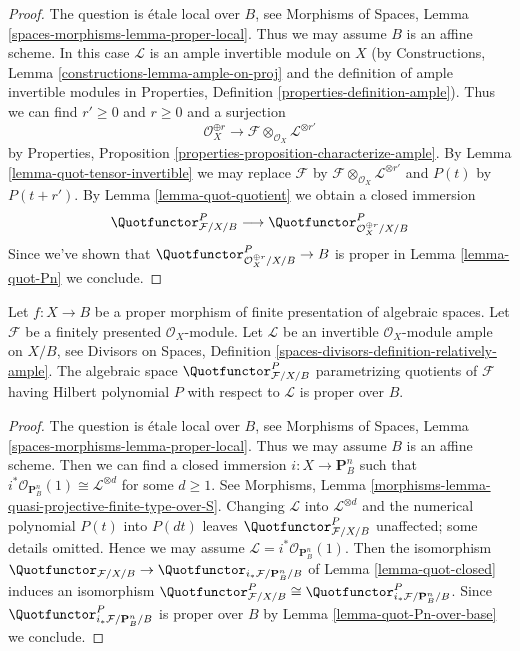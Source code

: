 \begin{proof}
The question is \'etale local over $B$, see
Morphisms of Spaces, Lemma \ref{spaces-morphisms-lemma-proper-local}.
Thus we may assume $B$ is an affine scheme.
In this case $\mathcal{L}$ is an ample invertible module on $X$
(by Constructions, Lemma \ref{constructions-lemma-ample-on-proj}
and the definition of ample invertible modules in
Properties, Definition \ref{properties-definition-ample}).
Thus we can find $r' \geq 0$ and $r \geq 0$ and a surjection
$$
\mathcal{O}_X^{\oplus r} \longrightarrow
\mathcal{F} \otimes_{\mathcal{O}_X} \mathcal{L}^{\otimes r'}
$$
by Properties, Proposition \ref{properties-proposition-characterize-ample}.
By Lemma \ref{lemma-quot-tensor-invertible}
we may replace $\mathcal{F}$ by
$\mathcal{F} \otimes_{\mathcal{O}_X} \mathcal{L}^{\otimes r'}$
and $P(t)$ by $P(t + r')$.
By Lemma \ref{lemma-quot-quotient}
we obtain a closed immersion
$$
\Quotfunctor^P_{\mathcal{F}/X/B}
\longrightarrow
\Quotfunctor^P_{\mathcal{O}_X^{\oplus r}/X/B}
$$
Since we've shown that $\Quotfunctor^P_{\mathcal{O}_X^{\oplus r}/X/B} \to B$
is proper in Lemma \ref{lemma-quot-Pn} we conclude.
\end{proof}

\begin{lemma}
\label{lemma-quot-proper-over-base}
Let $f : X \to B$ be a proper morphism of finite presentation
of algebraic spaces. Let $\mathcal{F}$ be a finitely presented
$\mathcal{O}_X$-module. Let $\mathcal{L}$ be an invertible
$\mathcal{O}_X$-module ample on $X/B$, see
Divisors on Spaces, Definition
\ref{spaces-divisors-definition-relatively-ample}.
The algebraic space $\Quotfunctor^P_{\mathcal{F}/X/B}$
parametrizing quotients of $\mathcal{F}$
having Hilbert polynomial $P$ with respect to $\mathcal{L}$
is proper over $B$.
\end{lemma}

\begin{proof}
The question is \'etale local over $B$, see
Morphisms of Spaces, Lemma \ref{spaces-morphisms-lemma-proper-local}.
Thus we may assume $B$ is an affine scheme.
Then we can find a closed immersion $i : X \to \mathbf{P}^n_B$
such that $i^*\mathcal{O}_{\mathbf{P}^n_B}(1) \cong \mathcal{L}^{\otimes d}$
for some $d \geq 1$. See
Morphisms, Lemma \ref{morphisms-lemma-quasi-projective-finite-type-over-S}.
Changing $\mathcal{L}$ into $\mathcal{L}^{\otimes d}$ and
the numerical polynomial $P(t)$ into $P(dt)$ leaves
$\Quotfunctor^P_{\mathcal{F}/X/B}$ unaffected; some details omitted.
Hence we may assume $\mathcal{L} = i^*\mathcal{O}_{\mathbf{P}^n_B}(1)$.
Then the isomorphism
$\Quotfunctor_{\mathcal{F}/X/B} \to
\Quotfunctor_{i_*\mathcal{F}/\mathbf{P}^n_B/B}$ of
Lemma \ref{lemma-quot-closed} induces an isomorphism
$\Quotfunctor^P_{\mathcal{F}/X/B} \cong
\Quotfunctor^P_{i_*\mathcal{F}/\mathbf{P}^n_B/B}$.
Since $\Quotfunctor^P_{i_*\mathcal{F}/\mathbf{P}^n_B/B}$
is proper over $B$ by Lemma \ref{lemma-quot-Pn-over-base}
we conclude.
\end{proof}

